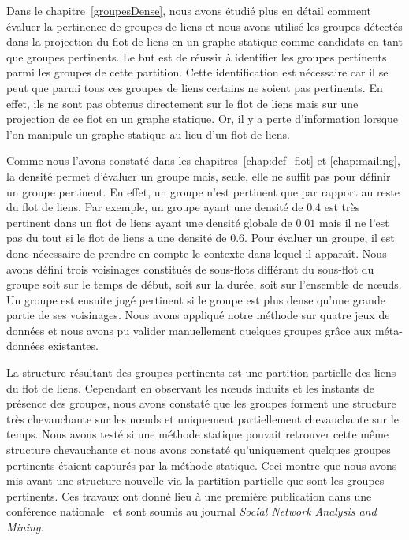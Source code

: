 \bigskip

Dans le chapitre~\ref{groupesDense}, nous avons étudié plus en détail comment évaluer la pertinence de groupes de liens et nous avons utilisé les groupes détectés dans la projection du flot de liens en un graphe statique comme candidats en tant que groupes pertinents.
Le but est de réussir à identifier les groupes pertinents parmi les groupes de cette partition.
Cette identification est nécessaire car il se peut que parmi tous ces groupes de liens certains ne soient pas pertinents.
En effet, ils ne sont pas obtenus directement sur le flot de liens mais sur une projection de ce flot en un graphe statique.
Or, il y a perte d'information lorsque l'on manipule un graphe statique au lieu d'un flot de liens.

Comme nous l'avons constaté dans les chapitres~\ref{chap:def_flot} et \ref{chap:mailing}, la densité permet d'évaluer un groupe mais, seule, elle ne suffit pas pour définir un groupe pertinent.
En effet, un groupe n'est pertinent que par rapport au reste du flot de liens.
Par exemple, un groupe ayant une densité de $0.4$ est très pertinent dans un flot de liens ayant une densité globale de $0.01$ mais il ne l'est pas du tout si le flot de liens a une densité de $0.6$.
Pour évaluer un groupe, il est donc nécessaire de prendre en compte le contexte dans lequel il apparaît.
Nous avons défini trois voisinages constitués de sous-flots différant du sous-flot du groupe soit sur le temps de début, soit sur la durée, soit sur l'ensemble de n\oe{}uds.
Un groupe est ensuite jugé pertinent si le groupe est plus dense qu'une grande partie de ses voisinages.
Nous avons appliqué notre méthode sur quatre jeux de données et nous avons pu valider manuellement quelques groupes grâce aux méta-données existantes.

La structure résultant des groupes pertinents est une partition partielle des liens du flot de liens.
Cependant en observant les n\oe{}uds induits et les instants de présence des groupes, nous avons constaté que les groupes forment une structure très chevauchante sur les n\oe{}uds et uniquement partiellement chevauchante sur le temps.
Nous avons testé si une méthode statique pouvait retrouver cette même structure chevauchante et nous avons constaté qu'uniquement quelques groupes pertinents étaient capturés par la méthode statique.
Ceci montre que nous avons mis avant une structure nouvelle via la partition partielle que sont les groupes pertinents.
Ces travaux ont donné lieu à une première publication dans une conférence nationale~\cite{gaumont:hal-01305118} et sont soumis au journal \emph{Social Network Analysis and Mining}.


